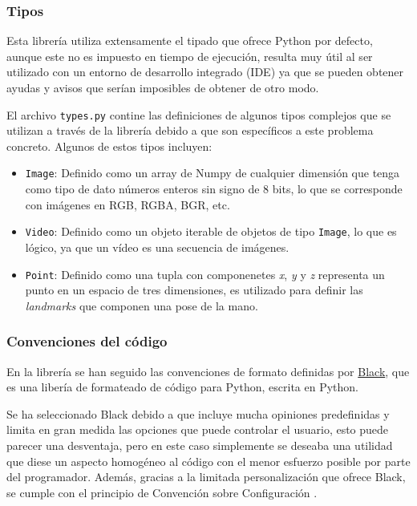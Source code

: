 \subsubsection{Tipos}

Esta librería utiliza extensamente el tipado que ofrece Python por defecto,
aunque este no es impuesto en tiempo de ejecución, resulta muy útil al ser
utilizado con un entorno de desarrollo integrado (IDE) ya que se pueden obtener
ayudas y avisos que serían imposibles de obtener de otro modo.

El archivo \texttt{types.py} contine las definiciones de algunos tipos complejos
que se utilizan a través de la librería debido a que son específicos a este
problema concreto. Algunos de estos tipos incluyen:

\begin{itemize}
    \item \texttt{Image}: Definido como un array de Numpy de cualquier dimensión
    que tenga como tipo de dato números enteros sin signo de 8 bits, lo que se
    corresponde con imágenes en RGB, RGBA, BGR, etc.
    \item \texttt{Video}: Definido como un objeto iterable de objetos de tipo
    \texttt{Image}, lo que es lógico, ya que un vídeo es una secuencia de
    imágenes.
    \item \texttt{Point}: Definido como una tupla con componenetes \textit{x},
    \textit{y} y \textit{z} representa un punto en un espacio de tres
    dimensiones, es utilizado para definir las \textit{landmarks} que componen
    una pose de la mano.
\end{itemize}

\subsubsection{Convenciones del código}

En la librería se han seguido las convenciones de formato definidas por
\href{https://github.com/psf/black}{Black}, que es una libería de formateado de
código para Python, escrita en Python.

Se ha seleccionado Black debido a que incluye mucha opiniones predefinidas y
limita en gran medida las opciones que puede controlar el usuario, esto puede
parecer una desventaja, pero en este caso simplemente se deseaba una utilidad
que diese un aspecto homogéneo al código con el menor esfuerzo posible por parte
del programador. Además, gracias a la limitada personalización que ofrece Black,
se cumple con el principio de Convención sobre Configuración
\cite{eswiki:125269135}.

